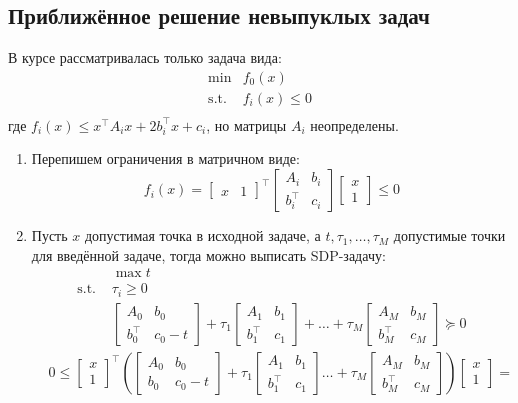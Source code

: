 \documentclass[11pt,a4paper]{report}
\def\le{\leqslant}
\theoremstyle{definition}
\theoremstyle{definition}
\theoremstyle{definition}
\begin{document}
	\subsection{Приближённое решение невыпуклых задач}
	В курсе рассматривалась только задача вида:
	\begin{align*}
		\min& f_0(x)\\
		\text{s.t. }& f_i(x) \le 0\\
	\end{align*}
	где $ f_i(x) \le x^{\top} A_i x + 2 b_i^\top x + c_i $, но матрицы $ A_i $ неопределены.
	\begin{enumerate}
		\item Перепишем ограничения в матричном виде:
		$$
			f_i(x) = 
			\begin{bmatrix}
				x & 1
			\end{bmatrix}^{\top}
			\begin{bmatrix}
				A_i & b_i\\
				b_i^\top & c_i
			\end{bmatrix}
			\begin{bmatrix}
				x \\ 1
			\end{bmatrix} \le 0
		$$ 
		\item Пусть $x$ допустимая точка в исходной задаче, а $t, \tau_1, \ldots, \tau_M$ допустимые точки для введённой задаче, тогда можно выписать SDP-задачу:
		\begin{align*}
			& \max t\\
			\text{s.t. } & \tau_i \geq 0\\
			& \begin{bmatrix} A_0 & b_0 \\ b_0^{\top} & c_0 - t \end{bmatrix} + \tau_1 \begin{bmatrix} A_1 & b_1 \\ b_1^{\top} & c_1 \end{bmatrix} + \ldots + \tau_M \begin{bmatrix} A_M & b_M \\ b_M^{\top} & c_M \end{bmatrix} \succeq 0
		\end{align*}
		\begin{align*}
			& 0 \leq \begin{bmatrix} x \\ 1 \end{bmatrix}^{\top} \left(\begin{bmatrix} A_0 & b_0\\ b_0 & c_0 - t \end{bmatrix} + \tau_1 \begin{bmatrix} A_1 & b_1\\ b^{\top}_1 & c_1 \end{bmatrix} \ldots + \tau_M \begin{bmatrix} A_M & b_M \\ b_M^{\top} & c_M \end{bmatrix}\right) \begin{bmatrix} x \\ 1 \end{bmatrix} = \\

\end{align*}
\end{enumerate}
\end{document}
